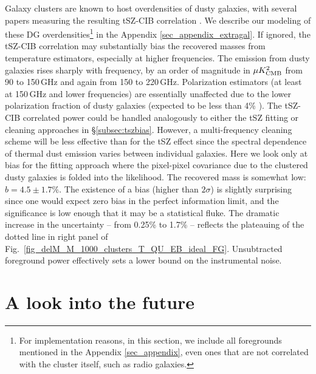 Galaxy clusters are known to host overdensities of dusty galaxies, with several papers measuring the resulting tSZ-CIB correlation \citep{actdunkley2013, george2015, PLANCKTSZCIB2016}.
We describe our modeling of these DG overdensities\footnote{For implementation reasons, in this section, we include all foregrounds mentioned in the Appendix \ref{sec_appendix}, even ones that are not correlated with the cluster itself, such as radio galaxies.} in the Appendix \ref{sec_appendix_extragal}.
If ignored, the tSZ-CIB correlation may substantially bias the recovered masses from temperature estimators, especially at higher frequencies.
The emission from dusty galaxies rises sharply with frequency, by an order of magnitude in $\mu K^2_{\rm CMB}$ from 90 to 150\,GHz and again from 150 to 220\,GHz.
Polarization estimators (at least at 150\,GHz and lower frequencies) are essentially unaffected due to the lower polarization fraction  of dusty galaxies (expected to be less than 4\% \citep{seiffert2007,sptpol_delensing_2017}).
The tSZ-CIB correlated power could be handled analogously to either the tSZ fitting or cleaning approaches in \S\ref{subsec:tszbias}.
However, a multi-frequency cleaning scheme will be less effective than for the tSZ effect since the spectral dependence of thermal dust emission varies between individual galaxies.
Here we look only at bias for the fitting approach where the pixel-pixel covariance due to the clustered dusty galaxies is folded into the likelihood.
The recovered mass is somewhat low: $b=4.5 \pm 1.7\%$.
The existence of a bias (higher than $2\sigma$) is slightly surprising since one would expect zero bias in the perfect information limit, and the significance is low enough that it may be a statistical fluke.
The dramatic increase in the uncertainty -- from 0.25\% to 1.7\% -- reflects the plateauing of the dotted line in right panel of Fig.~\ref{fig_delM_M_1000_clusters_T_QU_EB_ideal_FG}.
Unsubtracted foreground power effectively sets a lower bound on the instrumental noise.

\section{A look into the future}
\label{sec_forecast}

